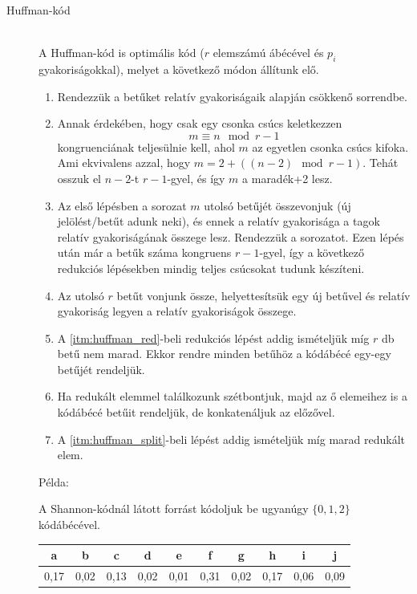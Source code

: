 \documentclass[margin=0px]{article}
\begin{document}
\begin{description}
				\item[Huffman-kód] \hfill \\
					A Huffman-kód is optimális kód ($r$ elemszámú ábécével és $p_i$ gyakoriságokkal), melyet a következő módon állítunk elő. 
					\begin{enumerate}
						\item Rendezzük a betűket relatív gyakoriságaik alapján csökkenő sorrendbe.
						\item Annak érdekében, hogy csak egy csonka csúcs keletkezzen 
						\[m \equiv n \mod{r-1}\] 
						kongruenciának teljesülnie kell, ahol $m$ az egyetlen csonka csúcs kifoka. Ami ekvivalens azzal, hogy $m = 2 + ((n-2) \mod{r-1})$. Tehát osszuk el $n-2$-t $r-1$-gyel, és így $m$ a maradék+2 lesz.
						\item Az első lépésben a sorozat $m$ utolsó betűjét összevonjuk (új jelölést/betűt adunk neki), és ennek a relatív gyakorisága a tagok relatív gyakoriságának összege lesz. Rendezzük a sorozatot. Ezen lépés után már a betűk száma kongruens $r-1$-gyel, így a következő redukciós lépésekben mindig teljes csúcsokat tudunk készíteni.
						\item \label{itm:huffman_red} Az utolsó $r$ betűt vonjunk össze, helyettesítsük egy új betűvel és relatív gyakoriság legyen a relatív gyakoriságok összege.
						\item A \ref{itm:huffman_red}-beli redukciós lépést addig ismételjük míg $r$ db betű nem marad. Ekkor rendre minden betűhöz a kódábécé egy-egy betűjét rendeljük.
						\item \label{itm:huffman_split} Ha redukált elemmel találkozunk szétbontjuk, majd az ő elemeihez is a kódábécé betűit rendeljük, de konkatenáljuk az előzővel.
						\item A \ref{itm:huffman_split}-beli lépést addig ismételjük míg marad redukált elem.
					\end{enumerate}
					
					Példa:
					
					A Shannon-kódnál látott forrást kódoljuk be ugyanúgy $\{0,1,2\}$ kódábécével.
					
					\begin{tabular}{|c|c|c|c|c|c|c|c|c|c|}
						\hline a & b & c & d & e & f & g & h & i & j \\ 
						\hline 0,17 & 0,02 & 0,13 & 0,02 & 0,01 & 0,31 & 0,02 & 0,17 & 0,06 & 0,09 \\ 
						\hline 
					\end{tabular} 
					

\end{description}
\end{document}
